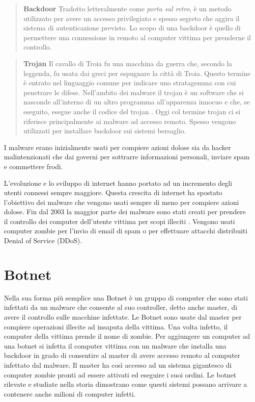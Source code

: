 \documentclass[../main.tex]{subfiles}
\begin{document}
\begin{verse}
				\textbf{Backdoor} Tradotto letteralmente come \textit{porta sul retro}, è un metodo utilizzato per avere un accesso privilegiato e spesso segreto che aggira il sistema di autenticazione previsto. Lo scopo di una backdoor è quello di permettere una connessione in remoto al computer vittima per prenderne il controllo.				
\end{verse}

\begin{verse}
				\textbf{Trojan} Il cavallo di Troia fu una macchina da guerra che, secondo la leggenda, fu usata dai greci per espugnare la città di Troia. Questo termine è entrato nel linguaggio comune per indicare uno stratagemma con cui penetrare le difese. Nell'ambito dei malware il trojan è un software che si nasconde all'interno di un altro programma all'apparenza innocuo e che, se eseguito, esegue anche il codice del trojan \cite{TrojanDef}.
				Oggi col termine trojan ci si riferisce principalmente ai malware ad accesso remoto. Spesso vengono utilizzati per installare backdoor sui sistemi bersaglio. \cite{TrojanPurpose}
\end{verse}

I malware erano inizialmente usati per compiere azioni dolose sia da hacker malintenzionati che dai governi per sottrarre informazioni personali, inviare spam e commettere frodi. \cite{ScopoMalware} \cite{MalwareRevolution}

L'evoluzione e lo sviluppo di internet hanno portato ad un incremento degli utenti connessi sempre maggiore. Questa crescita di internet ha spostato l'obiettivo dei malware che vengono usati sempre di meno per compiere azioni dolose. Fin dal 2003 la maggior parte dei malware sono stati creati per prendere il controllo dei computer dell'utente vittima per scopi illeciti \cite{MalwareRevolution}. Vengono usati computer zombie per l'invio di email di spam o per effettuare attacchi distribuiti Denial of Service (DDoS).


\section{Botnet}
Nella sua forma più semplice una Botnet è un gruppo di computer che sono stati infettati da un malware che consente al suo controller, detto anche master, di avere il controllo sulle macchine infettate. Le Botnet sono usate dal master per compiere operazioni illecite ad insaputa della vittima. Una volta infetto, il computer della vittima prende il nome di zombie. \cite{Botnet} \newline
Per aggiungere un computer ad una botnet si infetta il computer vittima con un malware che installa una backdoor in grado di consentire al master di avere accesso remoto al computer infettato dal malware.
Il master ha così accesso ad un sistema gigantesco di computer zombie pronti ad essere attivati ed eseguire i suoi ordini. Le botnet rilevate e studiate nella storia dimostrano come questi sistemi possano arrivare a contenere anche milioni di computer infetti. \cite{Botnet}
\end{document}
